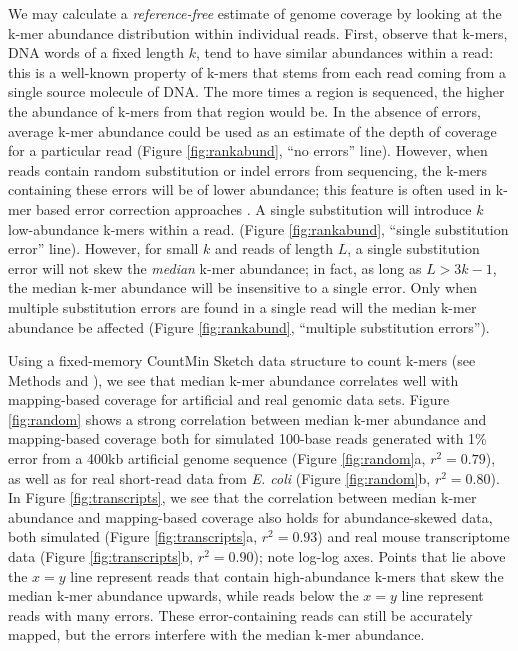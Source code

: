 \documentclass{pnastwo}
\begin{document}
\begin{article}
We may calculate a {\em reference-free} estimate of genome coverage by
looking at the k-mer abundance distribution within individual reads.
First, observe that k-mers, DNA words of a fixed length $k$, tend to
have similar abundances within a read: this is a well-known property
of k-mers that stems from each read coming from a single source
molecule of DNA.  The more times a region is sequenced, the higher the
abundance of k-mers from that region would be.  In the absence of
errors, average k-mer abundance could be used as an estimate
of the depth of coverage for a particular read (Figure
\ref{fig:rankabund}, ``no errors'' line).  However, when reads contain
random substitution or indel errors from sequencing, the k-mers
containing these errors will be of lower abundance; this feature is
often used in k-mer based error correction approaches
\cite{pubmed21114842}.  A single substitution will introduce $k$
low-abundance k-mers within a read.  (Figure \ref{fig:rankabund},
``single substitution error'' line).  However, for small $k$ and reads
of length $L$, a single substitution error will not skew the {\em
  median} k-mer abundance; in fact, as long as $L > 3k-1$, the median
k-mer abundance will be insensitive to a single error.  Only when
multiple substitution errors are found in a single read will the
median k-mer abundance be affected (Figure \ref{fig:rankabund},
``multiple substitution errors'').

Using a fixed-memory CountMin Sketch data structure to count k-mers
(see Methods and \cite{countminsketch}), we see that median k-mer
abundance correlates well with mapping-based coverage for artificial
and real genomic data sets.  Figure \ref{fig:random} shows a strong
correlation between median k-mer abundance and mapping-based coverage
both for simulated 100-base reads generated with 1\% error from a
400kb artificial genome sequence (Figure \ref{fig:random}a, $r^2 =
0.79$), as well as for real short-read data from {\em E. coli} (Figure
\ref{fig:random}b, $r^2 = 0.80$).  In Figure \ref{fig:transcripts}, we
see that the correlation between median k-mer abundance and
mapping-based coverage also holds for abundance-skewed data, both
simulated (Figure \ref{fig:transcripts}a, $r^2 = 0.93$) and real mouse
transcriptome data (Figure \ref{fig:transcripts}b, $r^2 = 0.90$); note
log-log axes.  Points that lie above the $x=y$ line represent reads
that contain high-abundance k-mers that skew the median k-mer
abundance upwards, while reads below the $x=y$ line represent reads
with many errors.  These error-containing reads can still be
accurately mapped, but the errors interfere with the median k-mer
abundance.


\end{article}
\end{document}
